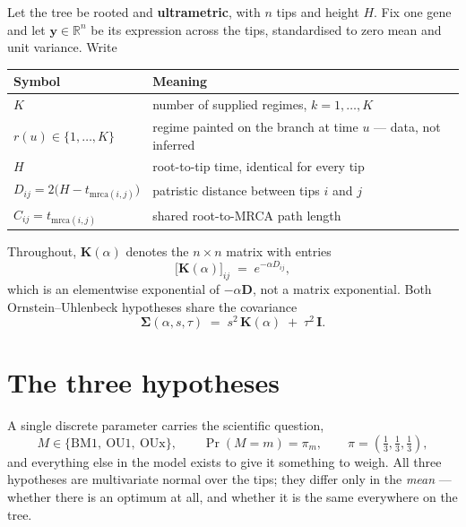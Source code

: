 \documentclass[11pt]{article}
\newcommand{\yv}{\mathbf{y}}
\newcommand{\Dm}{\mathbf{D}}
\newcommand{\Idm}{\mathbf{I}}
\newcommand{\Km}{\mathbf{K}}
\newcommand{\Sig}{\boldsymbol{\Sigma}}
\newcommand{\BM}{\mathrm{BM1}}
\newcommand{\OUo}{\mathrm{OU1}}
\newcommand{\OUx}{\mathrm{OUx}}
\begin{document}
Let the tree be rooted and \textbf{ultrametric}, with $n$ tips and height $H$. Fix one gene and let
$\yv \in \mathbb{R}^{n}$ be its expression across the tips, standardised to zero mean and unit
variance. Write

\begin{center}
\begin{tabular}{@{}ll@{}}
\toprule
Symbol & Meaning \\
\midrule
$K$ & number of supplied regimes, $k = 1,\dots,K$ \\
$r(u) \in \{1,\dots,K\}$ & regime painted on the branch at time $u$ --- data, not inferred \\
$H$ & root-to-tip time, identical for every tip \\
$D_{ij} = 2\bigl(H - t_{\mathrm{mrca}(i,j)}\bigr)$ & patristic distance between tips $i$ and $j$ \\
$C_{ij} = t_{\mathrm{mrca}(i,j)}$ & shared root-to-MRCA path length \\
\bottomrule
\end{tabular}
\end{center}

\noindent
Throughout, $\Km(\alpha)$ denotes the $n \times n$ matrix with entries
\begin{equation}
\bigl[\Km(\alpha)\bigr]_{ij} \;=\; e^{-\alpha D_{ij}},
\end{equation}
which is an elementwise exponential of $-\alpha\Dm$, not a matrix exponential. Both Ornstein--Uhlenbeck
hypotheses share the covariance
\begin{equation}
\Sig(\alpha, s, \tau) \;=\; s^{2}\,\Km(\alpha) \;+\; \tau^{2}\,\Idm .
\label{eq:sig}
\end{equation}

\section{The three hypotheses}

A single discrete parameter carries the scientific question,
\begin{equation}
M \in \{\BM,\ \OUo,\ \OUx\}, \qquad \Pr(M = m) = \pi_m, \qquad \pi = (\tfrac13,\tfrac13,\tfrac13),
\end{equation}
and everything else in the model exists to give it something to weigh. All three hypotheses are
multivariate normal over the tips; they differ only in the \emph{mean} --- whether there is an
optimum at all, and whether it is the same everywhere on the tree.
\end{document}
